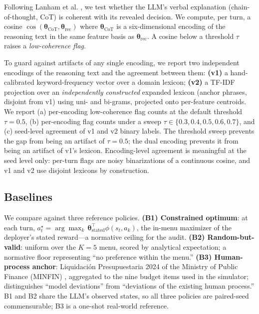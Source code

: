\documentclass[conference]{IEEEtran}
\begin{document}
Following Lanham et al. \cite{lanham2023}, we test whether the LLM's
verbal explanation (chain-of-thought, CoT) is coherent with its
revealed decision. We compute, per turn, a cosine
$\cos(\boldsymbol{\theta}_{\text{CoT}}, \boldsymbol{\theta}_{\text{rec}})$
where $\boldsymbol{\theta}_{\text{CoT}}$ is a six-dimensional encoding
of the reasoning text in the same feature basis as
$\boldsymbol{\theta}_{\text{rec}}$. A cosine below a threshold $\tau$
raises a \emph{low-coherence flag}.

To guard against artifacts of any single encoding, we report two
independent encodings of the reasoning text and the agreement between
them: \textbf{(v1)} a hand-calibrated keyword-frequency vector over a
domain lexicon; \textbf{(v2)} a TF-IDF projection over an
\emph{independently constructed} expanded lexicon (anchor phrases,
disjoint from v1) using uni- and bi-grams, projected onto per-feature
centroids. We report (a) per-encoding low-coherence flag counts at the
default threshold $\tau{=}0.5$, (b) per-encoding flag counts under a
sweep $\tau \in \{0.3,0.4,0.5,0.6,0.7\}$, and (c) seed-level
agreement of v1 and v2 binary labels. The threshold sweep prevents
the gap from being an artifact of $\tau{=}0.5$; the dual encoding
prevents it from being an artifact of v1's lexicon. Encoding-level
agreement is meaningful at the seed level only: per-turn flags are
noisy binarizations of a continuous cosine, and v1 and v2 use disjoint
lexicons by construction.

\subsection{Baselines}

We compare against three reference policies. \textbf{(B1)
Constrained optimum}: at each turn, $a_t^\star{=}\arg\max_k\,
\boldsymbol{\theta}_{\text{stated}}^\top\phi(s_t, a_k)$, the
in-menu maximizer of the deployer's stated reward---a normative
ceiling for the audit. \textbf{(B2) Random-but-valid}: uniform over
the $K{=}5$ menu, scored by analytical expectation; a normative
floor representing ``no preference within the menu.''
\textbf{(B3) Human-process anchor}: Liquidaci\'on Presupuestaria
2024 of the Ministry of Public Finance (MINFIN) \cite{minfin},
aggregated to the nine budget items used in the simulator;
distinguishes ``model deviations'' from ``deviations of the existing
human process.'' B1 and B2 share the LLM's observed states, so all
three policies are paired-seed commensurable; B3 is a one-shot
real-world reference.
\end{document}
